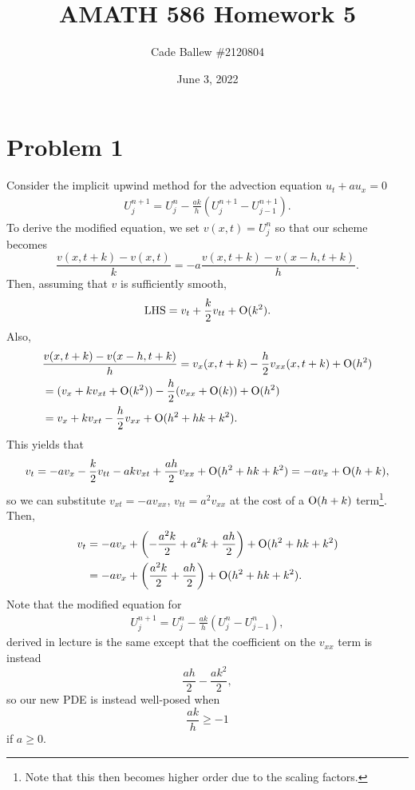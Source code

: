 \documentclass{article}
\title{AMATH 586 Homework 5}
\author{Cade Ballew \#2120804}
\date{June 3, 2022}
\begin{document}
	
\maketitle
	
\section{Problem 1}
Consider the implicit upwind method for the advection equation $u_t + a u_x = 0$
\begin{align*}
	U_{j}^{n+1} = U_{j}^n  - \frac{ak}{h} \left( U_j^{n+1} - U_{j-1}^{n+1} \right).
\end{align*}
To derive the modified equation, we set $v(x,t)=U_j^n$ so that our scheme becomes
\[
\frac{v(x,t+k)-v(x,t)}{k}=-a\frac{v(x,t+k)-v(x-h,t+k)}{h}.
\]
Then, assuming that $v$ is sufficiently smooth,
\[
\text{LHS}=v_t+\frac{k}{2}v_{tt}+\operatorname{O}(k^2).
\]
Also,
\begin{align*}
&\frac{v(x,t+k)-v(x-h,t+k)}{h}=v_x(x,t+k)-\frac{h}{2}v_{xx}(x,t+k)+\operatorname{O}(h^2)\\&=
(v_x+kv_{xt}+\operatorname{O}(k^2))-\frac{h}{2}(v_{xx}+\operatorname{O}(k))+\operatorname{O}(h^2)\\&=
v_x+kv_{xt}-\frac{h}{2}v_{xx}+\operatorname{O}(h^2+hk+k^2).
\end{align*}
This yields that 
\begin{align*}
v_t=-av_x-\frac{k}{2}v_{tt}-akv_{xt}+\frac{ah}{2}v_{xx}+\operatorname{O}(h^2+hk+k^2)=-av_x+\operatorname{O}(h+k), 
\end{align*}
so we can substitute $v_{xt}=-av_{xx}$, $v_{tt}=a^2v_{xx}$ at the cost of a $\operatorname{O}(h+k)$ term\footnote{Note that this then becomes higher order due to the scaling factors.}. Then,
\begin{align*}
v_t&=-av_x+\left(-\frac{a^2k}{2}+a^2k+\frac{ah}{2}\right)+\operatorname{O}(h^2+hk+k^2)\\&=
-av_x+\left(\frac{a^2k}{2}+\frac{ah}{2}\right)+\operatorname{O}(h^2+hk+k^2).
\end{align*}
Note that the modified equation for 
\begin{align*}
	U_{j}^{n+1} = U_{j}^n  - \frac{ak}{h} \left( U_j^{n} - U_{j-1}^{n} \right),
\end{align*}
derived in lecture is the same except that the coefficient on the $v_{xx}$ term is instead 
\[
\frac{ah}{2}-\frac{ak^2}{2},
\]
so our new PDE is instead well-posed when
\[
\frac{ak}{h}\geq-1
\]
if $a\geq0$.
\end{document}
